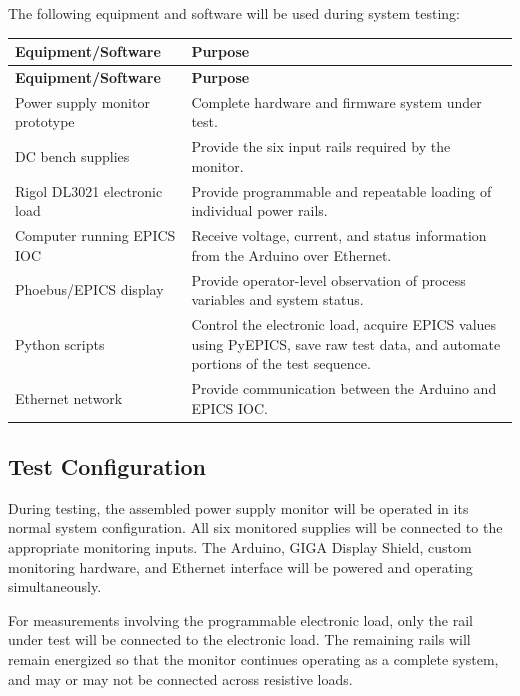 The following equipment and software will be used during system testing:

\renewcommand{\arraystretch}{1.3}
\begin{longtable}{p{} p{}}
	\toprule
	\textbf{Equipment/Software} & \textbf{Purpose} \\
	\midrule
	\endfirsthead
	
	\toprule
	\textbf{Equipment/Software} & \textbf{Purpose} \\
	\midrule
	\endhead
	
	Power supply monitor prototype &
	Complete hardware and firmware system under test. \\
	
	DC bench supplies &
	Provide the six input rails required by the monitor. \\
	
	Rigol DL3021 electronic load &
	Provide programmable and repeatable loading of individual power rails. \\
	
	Computer running EPICS IOC &
	Receive voltage, current, and status information from the Arduino over Ethernet. \\
	
	Phoebus/EPICS display &
	Provide operator-level observation of process variables and system status. \\
	
	Python scripts &
	Control the electronic load, acquire EPICS values using PyEPICS, save raw
	test data, and automate portions of the test sequence. \\
	
	Ethernet network &
	Provide communication between the Arduino and EPICS IOC. \\
	
	\bottomrule
\end{longtable}

\subsection{Test Configuration}

During testing, the assembled power supply monitor will be operated in its normal
system configuration. All six monitored supplies will be connected to the appropriate
monitoring inputs. The Arduino, GIGA Display Shield, custom monitoring hardware,
and Ethernet interface will be powered and operating simultaneously.

For measurements involving the programmable electronic load, only the rail under
test will be connected to the electronic load. The remaining rails will remain
energized so that the monitor continues operating as a complete system, and may or may not be connected across resistive loads.

